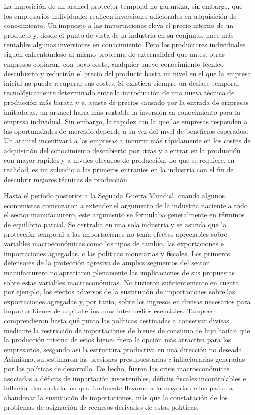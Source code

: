 \documentclass[10pt,a4paper]{article}
\begin{document}
La imposición de un arancel protector temporal no garantiza, sin embargo, que los empresarios individuales realicen inversiones adicionales en adquisición de conocimiento. Un impuesto a las importaciones eleva el precio interno de un producto y, desde el punto de vista de la industria en su conjunto, hace más rentables algunas inversiones en conocimiento. Pero los productores individuales siguen enfrentándose al mismo problema de externalidad que antes: otras empresas copiarán, con poco coste, cualquier nuevo conocimiento técnico descubierto y reducirán el precio del producto hasta un nivel en el que la empresa inicial no pueda recuperar sus costes. Si existiera siempre un desfase temporal tecnológicamente determinado entre la introducción de una nueva técnica de producción más barata y el ajuste de precios causado por la entrada de empresas imitadoras, un arancel haría más rentable la inversión en conocimiento para la empresa individual. Sin embargo, la rapidez con la que las empresas responden a las oportunidades de mercado depende a su vez del nivel de beneficios esperados. Un arancel incentivará a las empresas a incurrir más rápidamente en los costes de adquisición del conocimiento descubierto por otras y a entrar en la producción con mayor rapidez y a niveles elevados de producción. Lo que se requiere, en realidad, es un subsidio a los primeros entrantes en la industria con el fin de descubrir mejores técnicas de producción.

Hasta el período posterior a la Segunda Guerra Mundial, cuando algunos economistas comenzaron a extender el argumento de la industria naciente a todo el sector manufacturero, este argumento se formulaba generalmente en términos de equilibrio parcial. Se centraba en una sola industria y se asumía que la protección temporal a las importaciones no tenía efectos apreciables sobre variables macroeconómicas como los tipos de cambio, las exportaciones e importaciones agregadas, o las políticas monetarias y fiscales. Los primeros defensores de la protección agresiva de amplios segmentos del sector manufacturero no apreciaron plenamente las implicaciones de sus propuestas sobre estas variables macroeconómicas. No tuvieron suficientemente en cuenta, por ejemplo, los efectos adversos de la sustitución de importaciones sobre las exportaciones agregadas y, por tanto, sobre los ingresos en divisas necesarios para importar bienes de capital e insumos intermedios esenciales. Tampoco comprendieron hasta qué punto las políticas destinadas a conservar divisas mediante la restricción de importaciones de bienes de consumo de lujo harían que la producción interna de estos bienes fuera la opción más atractiva para los empresarios, sesgando así la estructura productiva en una dirección no deseada. Asimismo, subestimaron las presiones presupuestarias e inflacionarias generadas por las políticas de desarrollo. De hecho, fueron las crisis macroeconómicas asociadas a déficits de importación insostenibles, déficits fiscales incontrolables e inflación desbordada las que finalmente llevaron a la mayoría de los países a abandonar la sustitución de importaciones, más que la constatación de los problemas de asignación de recursos derivados de estas políticas.
\end{document}
